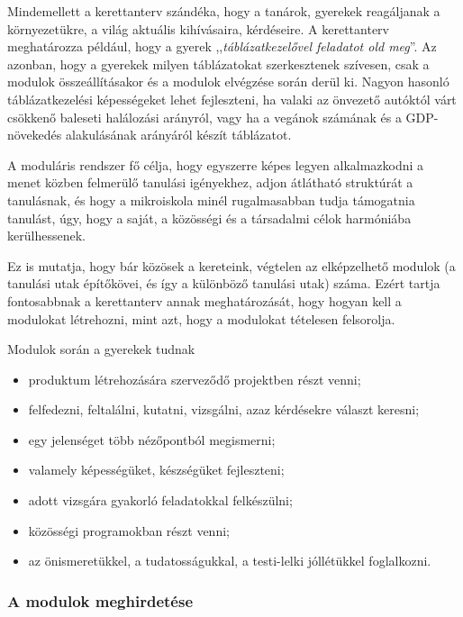Mindemellett a kerettanterv szándéka, hogy a tanárok, gyerekek reagáljanak a környezetükre, a világ aktuális kihívásaira, kérdéseire. A kerettanterv meghatározza például, hogy a gyerek ,,\emph{táblázatkezelővel feladatot old meg}''. Az azonban, hogy a gyerekek milyen táblázatokat szerkesztenek szívesen, csak a modulok összeállításakor és a modulok elvégzése során derül ki. Nagyon hasonló táblázatkezelési képességeket lehet fejleszteni, ha valaki az önvezető autóktól várt csökkenő baleseti halálozási arányról, vagy ha a vegánok számának és a GDP-növekedés alakulásának arányáról készít táblázatot.

A moduláris rendszer fő célja, hogy egyszerre képes legyen alkalmazkodni a menet közben felmerülő tanulási igényekhez, adjon átlátható struktúrát a tanulásnak, és hogy a mikroiskola minél rugalmasabban tudja támogatni\break a tanulást, úgy, hogy a saját, a közösségi és a társadalmi célok harmóniába kerülhessenek.

Ez is mutatja, hogy bár közösek a kereteink, végtelen az elképzelhető modulok (a tanulási utak építőkövei, és így a különböző tanulási utak) száma. Ezért tartja fontosabbnak a kerettanterv annak meghatározását, hogy hogyan kell a modulokat létrehozni, mint azt, hogy a modulokat tételesen felsorolja.

Modulok során a gyerekek tudnak

\begin{itemize}
      \item produktum létrehozására szerveződő projektben részt venni;

      \item felfedezni, feltalálni, kutatni, vizsgálni, azaz kérdésekre választ keresni;

      \item egy jelenséget több nézőpontból megismerni;

      \item valamely képességüket, készségüket fejleszteni;

      \item adott vizsgára gyakorló feladatokkal felkészülni;

      \item közösségi programokban részt venni;

      \item az önismeretükkel, a tudatosságukkal, a testi-lelki jóllétükkel foglalkozni.
\end{itemize}

\subsubsection{A modulok meghirdetése}

